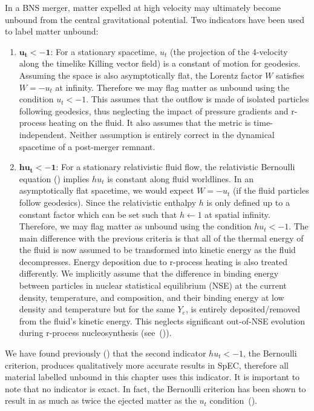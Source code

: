 In a BNS merger, matter expelled at high velocity may
ultimately become unbound from the central gravitational potential. Two indicators have been used to label matter unbound:
%
\begin{enumerate}
\item{$\mathbf{u_t < -1}$: For a stationary spacetime, $u_t$ (the projection of the 4-velocity along the timelike Killing vector field) is a constant of motion for geodesics. Assuming the space is also asymptotically flat, the Lorentz factor $W$ satisfies $W = -u_t$ at infinity. Therefore we may flag matter as unbound using the condition  $u_t < -1$. This assumes that the outflow is made of isolated particles following geodesics, thus neglecting the impact of pressure gradients and r-process heating on the fluid. It also assumes that the metric is time-independent. Neither assumption is entirely correct in the dynamical spacetime of a post-merger remnant.} \\
\item{$\mathbf{hu_t < -1}$: For a stationary relativistic fluid flow, the relativistic Bernoulli equation (\citet*{rezzolla2013relativistic}) implies $hu_t$ is constant along fluid worldlines. In an asymptotically flat spacetime, we would expect $W = -u_t$ (if the fluid particles follow geodesics). Since the relativistic enthalpy $h$ is only defined up to a constant factor which can be set such that $h \leftarrow 1$ at spatial infinity. Therefore, we may flag matter as unbound using the condition $hu_t < -1$. The main difference with the previous criteria is that all of the thermal energy of the fluid is now assumed to be transformed into kinetic energy as the fluid decompresses. Energy deposition due to r-process heating is also treated differently. We implicitly assume that the difference in binding energy between particles in nuclear statistical equilibrium (NSE) at the current density, temperature, and composition, and their binding energy at low density and temperature but for the same $Y_e$, is entirely deposited/removed from the fluid's kinetic energy. This neglects significant out-of-NSE evolution during r-process nucleosynthesis (see~(\citet*{foucartbhns2016}))}.
\end{enumerate}

We have found previously (\citet*{foucart:2015gaa}) that the second indicator $hu_t < -1$, the Bernoulli criterion, produces
qualitatively more accurate results in SpEC, therefore all material labelled unbound in this chapter uses this indicator. It is important to note that no indicator is exact.  In fact, the Bernoulli criterion has been shown to result in as much as twice the ejected matter as the $u_t$ condition~(\citet*{kastaun:2014fna}). 

